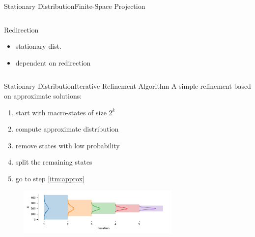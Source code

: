 \documentclass{beamer}
\newcommand{\bottomcite}[1]{\vspace*{\fill} {\scriptsize \parencite{#1}}}
\begin{document}
\begin{frame}{Stationary Distribution}{Finite-Space Projection}
\begin{columns}
\begin{column}{.30\textwidth}
\begin{block}{Redirection}
                {\small
                \begin{itemize}
                    \item stationary dist.
                    \item dependent on redirection
                \end{itemize}
                }
            \end{block}
        \end{column}
    \end{columns}
\end{frame}

\begin{frame}{Stationary Distribution}{Iterative Refinement Algorithm}
    A simple refinement based on approximate solutions:
    \begin{enumerate}
        \item start with macro-states of size $2^k$
        \item\label{itm:approx} compute approximate distribution
        \item remove states with low probability
        \item split the remaining states
        \item go to step \ref{itm:approx}
    \end{enumerate}
    \begin{figure}
        \includegraphics[width=8cm]{../gfx/bd_truncs.pdf}
    \end{figure}
    \bottomcite{backenkohler2020analysis,backenkohler2021abstraction}
\end{frame}
\end{document}
